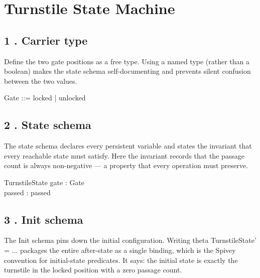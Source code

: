 \documentclass[a4paper,10pt,fleqn]{article}
\begin{document}
\section*{Turnstile State Machine}

\subsection*{1 . Carrier type}

\noindent Define the two gate positions as a free type.  Using a named type (rather than a boolean) makes the state schema self-documenting and prevents silent confusion between the two values.

\bigskip

\begin{zed}
Gate ::= locked | unlocked
\end{zed}

\subsection*{2 . State schema}

\noindent The state schema declares every persistent variable and states the invariant that every reachable state must satisfy.  Here the invariant records that the passage count is always non-negative --- a property that every operation must preserve.

\bigskip

\begin{schema}{TurnstileState}
gate : Gate \\
passed : \nat
\where
passed 
\end{schema}

\subsection*{3 . Init schema}

\noindent The Init schema pins down the initial configuration.  Writing theta TurnstileState' = ... packages the entire after-state as a single binding, which is the Spivey convention for initial-state predicates.  It says: the initial state is exactly the turnstile in the locked position with a zero passage count.

\bigskip
\end{document}
